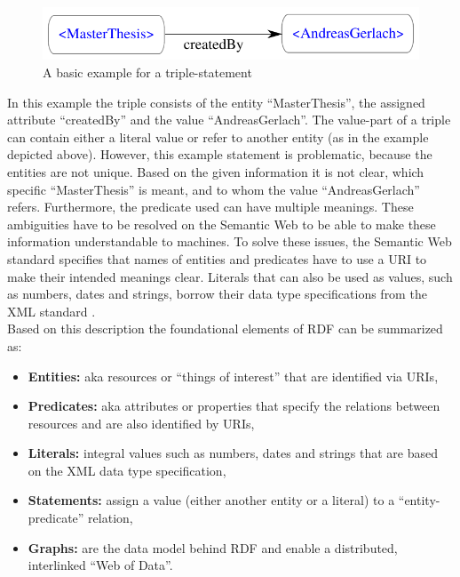 \begin{figure}[H]
	\centering
		\includegraphics[width=0.8\columnwidth]{images/sample_triple.pdf}
	\caption{A basic example for a triple-statement}
\label{fig:images_semweb_triple}
\end{figure}

In this example the triple consists of the entity ``MasterThesis'', the assigned attribute ``createdBy'' and the value ``AndreasGerlach''. The value-part of a triple can contain either a literal value or refer to another entity (as in the example depicted above). However, this example statement is problematic, because the entities are not unique. Based on the given information it is not clear, which specific ``MasterThesis'' is meant, and to whom the value ``AndreasGerlach'' refers. Furthermore, the predicate used can have multiple meanings. These ambiguities have to be resolved on the Semantic Web to be able to make these information understandable to machines. To solve these issues, the Semantic Web standard specifies that names of entities and predicates have to use a \gls{URI} to make their intended meanings clear. Literals that can also be used as values, such as numbers, dates and strings, borrow their data type specifications from the \gls{XML} standard \citep[pg. 15-38]{wood2014linked}. \\

Based on this description the foundational elements of \gls{RDF} can be summarized as: \@

\begin{itemize}
	\item \textbf{Entities:} aka resources or ``things of interest'' that are identified via \gls{URI}s,
	\item \textbf{Predicates:} aka attributes or properties that specify the relations between resources and are also identified by \gls{URI}s,
	\item \textbf{Literals:} integral values such as numbers, dates and strings that are based on the \gls{XML} data type specification,
	\item \textbf{Statements:} assign a value (either another entity or a literal) to a ``entity-predicate'' relation,
	\item \textbf{Graphs:} are the data model behind \gls{RDF} and enable a  distributed, interlinked ``Web of Data''.
\end{itemize}

